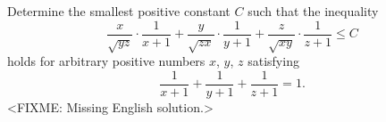 \problem
Determine the smallest positive constant $C$ such that the inequality
\[
   \frac{x}{\sqrt{yz}} \cdot \frac{1}{x+1}
   +
   \frac{y}{\sqrt{zx}} \cdot \frac{1}{y+1}
   +
   \frac{z}{\sqrt{xy}} \cdot \frac{1}{z+1}
\leq
   C
\]
holds for arbitrary positive numbers $x$, $y$, $z$ satisfying
\[
   \frac{1}{x+1} + \frac{1}{y+1} + \frac{1}{z+1}
=
   1
.\]
\solution
<FIXME: Missing English solution.>
\endproblem

